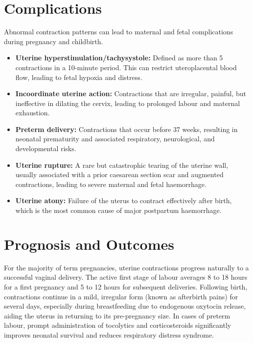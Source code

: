 \section*{Complications}
Abnormal contraction patterns can lead to maternal and fetal complications during pregnancy and childbirth.
\begin{itemize}
    \item \textbf{Uterine hyperstimulation/tachysystole:} Defined as more than 5 contractions in a 10-minute period. This can restrict uteroplacental blood flow, leading to fetal hypoxia and distress.
    \item \textbf{Incoordinate uterine action:} Contractions that are irregular, painful, but ineffective in dilating the cervix, leading to prolonged labour and maternal exhaustion.
    \item \textbf{Preterm delivery:} Contractions that occur before 37 weeks, resulting in neonatal prematurity and associated respiratory, neurological, and developmental risks.
    \item \textbf{Uterine rupture:} A rare but catastrophic tearing of the uterine wall, usually associated with a prior caesarean section scar and augmented contractions, leading to severe maternal and fetal haemorrhage.
    \item \textbf{Uterine atony:} Failure of the uterus to contract effectively after birth, which is the most common cause of major postpartum haemorrhage.
\end{itemize}

\section*{Prognosis and Outcomes}
For the majority of term pregnancies, uterine contractions progress naturally to a successful vaginal delivery. The active first stage of labour averages 8 to 18 hours for a first pregnancy and 5 to 12 hours for subsequent deliveries. Following birth, contractions continue in a mild, irregular form (known as afterbirth pains) for several days, especially during breastfeeding due to endogenous oxytocin release, aiding the uterus in returning to its pre-pregnancy size. In cases of preterm labour, prompt administration of tocolytics and corticosteroids significantly improves neonatal survival and reduces respiratory distress syndrome.

